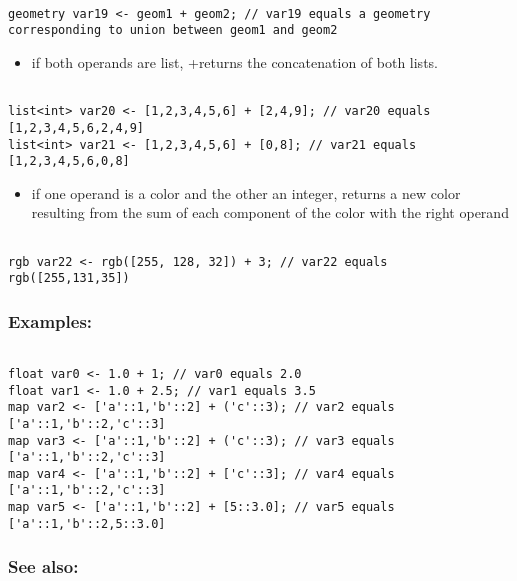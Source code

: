 \documentclass[]{book}
\providecommand{\tightlist}{%
  \setlength{\itemsep}{0pt}\setlength{\parskip}{0pt}}
\theoremstyle{definition}
\theoremstyle{definition}
\theoremstyle{definition}
\theoremstyle{remark}
\begin{document}
\begin{verbatim}
 
geometry var19 <- geom1 + geom2; // var19 equals a geometry corresponding to union between geom1 and geom2
\end{verbatim}

\begin{itemize}
\tightlist
\item
  if both operands are list, +returns the concatenation of both lists.
\end{itemize}

\begin{verbatim}
 
list<int> var20 <- [1,2,3,4,5,6] + [2,4,9]; // var20 equals [1,2,3,4,5,6,2,4,9] 
list<int> var21 <- [1,2,3,4,5,6] + [0,8]; // var21 equals [1,2,3,4,5,6,0,8]
\end{verbatim}

\begin{itemize}
\tightlist
\item
  if one operand is a color and the other an integer, returns a new
  color resulting from the sum of each component of the color with the
  right operand
\end{itemize}

\begin{verbatim}
 
rgb var22 <- rgb([255, 128, 32]) + 3; // var22 equals rgb([255,131,35])
\end{verbatim}

\subsubsection{Examples:}\label{examples-6}

\begin{verbatim}
 
float var0 <- 1.0 + 1; // var0 equals 2.0 
float var1 <- 1.0 + 2.5; // var1 equals 3.5 
map var2 <- ['a'::1,'b'::2] + ('c'::3); // var2 equals ['a'::1,'b'::2,'c'::3] 
map var3 <- ['a'::1,'b'::2] + ('c'::3); // var3 equals ['a'::1,'b'::2,'c'::3] 
map var4 <- ['a'::1,'b'::2] + ['c'::3]; // var4 equals ['a'::1,'b'::2,'c'::3] 
map var5 <- ['a'::1,'b'::2] + [5::3.0]; // var5 equals ['a'::1,'b'::2,5::3.0]
\end{verbatim}

\subsubsection{See also:}\label{see-also-8}
\end{document}
